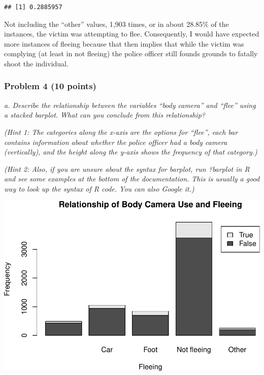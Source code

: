 \documentclass[
]{article}
\newenvironment{Shaded}{\begin{snugshade}}{\end{snugshade}}
\newcommand{\AttributeTok}[1]{\textcolor[rgb]{0.77,0.63,0.00}{#1}}
\newcommand{\ConstantTok}[1]{\textcolor[rgb]{0.00,0.00,0.00}{#1}}
\newcommand{\FunctionTok}[1]{\textcolor[rgb]{0.00,0.00,0.00}{#1}}
\newcommand{\NormalTok}[1]{#1}
\newcommand{\OtherTok}[1]{\textcolor[rgb]{0.56,0.35,0.01}{#1}}
\newcommand{\SpecialCharTok}[1]{\textcolor[rgb]{0.00,0.00,0.00}{#1}}
\newcommand{\StringTok}[1]{\textcolor[rgb]{0.31,0.60,0.02}{#1}}
\begin{document}
\begin{verbatim}
## [1] 0.2885957
\end{verbatim}

Not including the ``other'' values, 1,903 times, or in about 28.85\% of
the instances, the victim was attempting to flee. Consequently, I would
have expected more instances of fleeing because that then implies that
while the victim was complying (at least in not fleeing) the police
officer still founds grounds to fatally shoot the individual.

\hypertarget{problem-4-10-points}{%
\subsubsection{Problem 4 (10 points)}\label{problem-4-10-points}}

\emph{a. Describe the relationship between the variables ``body camera''
and ``flee'' using a stacked barplot. What can you conclude from this
relationship?}

\emph{(Hint 1: The categories along the x-axis are the options for
``flee'', each bar contains information about whether the police officer
had a body camera (vertically), and the height along the y-axis shows
the frequency of that category.)}

\emph{(Hint 2: Also, if you are unsure about the syntax for barplot, run
?barplot in R and see some examples at the bottom of the documentation.
This is usually a good way to look up the syntax of R code. You can also
Google it.)}

\begin{Shaded}
\end{Shaded}

\includegraphics{Journal_files/figure-latex/unnamed-chunk-30-1.pdf}
\end{document}

